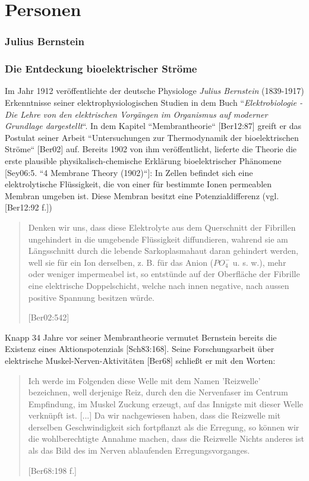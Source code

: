 \chapter{Personen}

\subsection{Julius Bernstein}\label{appendix:bernstein}

\subsection*{Die Entdeckung bioelektrischer Ströme}

Im Jahr 1912 veröffentlichte der deutsche Physiologe \textit{Julius Bernstein} (1839-1917) Erkenntnisse seiner elektrophysiologischen Studien in dem Buch ``\textit{Elektrobiologie - Die Lehre von den elektrischen Vorgängen im Organismus auf moderner Grundlage dargestellt}``.
In dem Kapitel ``Membrantheorie`` [Ber12:87] greift er das Postulat seiner Arbeit ``Untersuchungen zur Thermodynamik der bioelektrischen Ströme`` [Ber02] auf.
Bereits 1902 von ihm veröffentlicht, lieferte die Theorie die erste plausible physikalisch-chemische Erklärung bioelektrischer Phänomene [Sey06:5. ``4 Membrane Theory (1902)``]:
In Zellen befindet sich eine elektrolytische Flüssigkeit, die von einer für bestimmte Ionen permeablen Membran umgeben ist. Diese Membran besitzt eine Potenzialdifferenz (vgl. {[Ber12:92 f.]})

\blockquote[{[Ber02:542]}]{
    Denken wir uns, dass diese Elektrolyte aus dem Querschnitt der Fibrillen ungehindert in die umgebende Flüssigkeit diffundieren, wahrend sie am Längsschnitt durch die lebende Sarkoplasmahaut daran gehindert werden, well sie für ein Ion derselben, z. B. für das Anion ($PO^-_4$ u. s. w.), mehr oder weniger impermeabel ist, so entstünde auf der Oberfläche der Fibrille eine elektrische Doppelschicht, welche nach innen negative, nach aussen positive Spannung besitzen würde.
}

Knapp 34 Jahre vor seiner Membrantheorie vermutet Bernstein bereits die Existenz eines Aktionspotenzials [Sch83:168]. Seine Forschungsarbeit über elektrische Muskel-Nerven-Aktivitäten {[Ber68]} schließt er mit den Worten:

\blockquote[{[Ber68:198 f.]}]{
    Ich werde im Folgenden diese Welle mit dem Namen 'Reizwelle' bezeichnen, well derjenige Reiz, durch den die Nervenfaser im Centrum Empfindung, im Muskel Zuckung erzeugt, auf das  Innigste mit dieser Welle verknüpft ist. {[...]} Da wir nachgewiesen haben, dass die Reizwelle mit derselben Geschwindigkeit sich fortpflanzt als die Erregung, so können wir die wohlberechtigte Annahme machen, dass die Reizwelle Nichts anderes ist als das Bild des im Nerven ablaufenden Erregungsvorganges.
}

